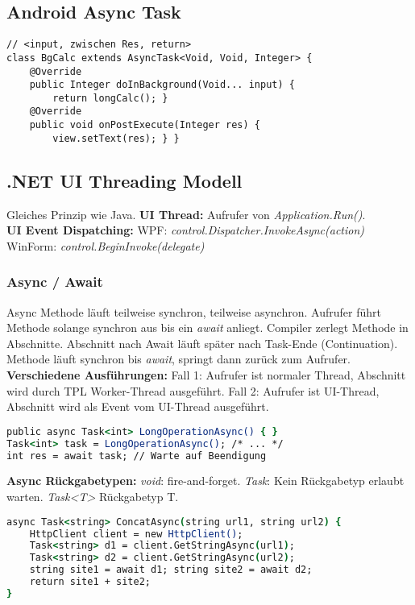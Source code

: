 \subsection{Android Async Task}
\begin{lstlisting}
// <input, zwischen Res, return>
class BgCalc extends AsyncTask<Void, Void, Integer> {
    @Override
    public Integer doInBackground(Void... input) {
        return longCalc(); }
    @Override
    public void onPostExecute(Integer res) {
        view.setText(res); } }
\end{lstlisting}

\subsection{.NET UI Threading Modell}
Gleiches Prinzip wie Java.
\textbf{UI Thread:} Aufrufer von \textit{Application.Run()}.\\ 
\textbf{UI Event Dispatching:}
WPF: \textit{control.Dispatcher.InvokeAsync(action)}\\ 
WinForm: \textit{control.BeginInvoke(delegate)}

\subsubsection{Async / Await}
Async Methode läuft teilweise synchron, teilweise asynchron.
Aufrufer führt Methode solange synchron aus bis ein \textit{await} anliegt.
Compiler zerlegt Methode in Abschnitte. Abschnitt nach Await läuft später nach Task-Ende (Continuation).
Methode läuft synchron bis \textit{await}, springt dann zurück zum Aufrufer.\\ 
\textbf{Verschiedene Ausführungen:} Fall 1: Aufrufer ist normaler Thread, Abschnitt wird durch TPL Worker-Thread ausgeführt.
Fall 2: Aufrufer ist UI-Thread, Abschnitt wird als Event vom UI-Thread ausgeführt.
\begin{lstlisting}[language=csh]
public async Task<int> LongOperationAsync() { }
Task<int> task = LongOperationAsync(); /* ... */
int res = await task; // Warte auf Beendigung
\end{lstlisting}
\textbf{Async Rückgabetypen:}
\textit{void}: fire-and-forget.
\textit{Task}: Kein Rückgabetyp erlaubt warten.
\textit{Task\textless T\textgreater} Rückgabetyp T.
\begin{lstlisting}[language=csh]
async Task<string> ConcatAsync(string url1, string url2) {
    HttpClient client = new HttpClient();
    Task<string> d1 = client.GetStringAsync(url1);
    Task<string> d2 = client.GetStringAsync(url2);
    string site1 = await d1; string site2 = await d2;
    return site1 + site2;
}
\end{lstlisting}